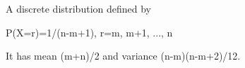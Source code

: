 A discrete distribution defined by 
\par
P(X=r)=1/(n-m+1), r=m, m+1, ..., n
\par
It has mean (m+n)/2 and variance (n-m)(n-m+2)/12.
